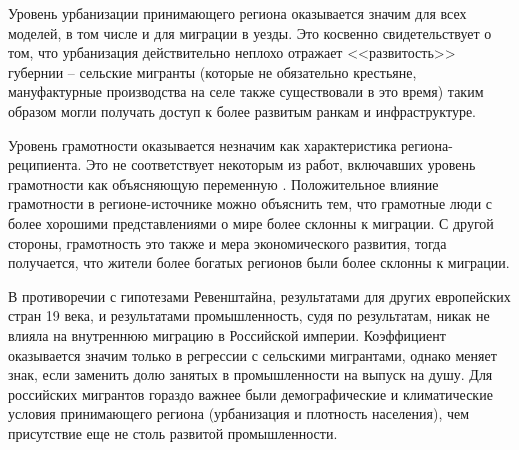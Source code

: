 \documentclass[a4paper,12pt]{article}
\begin{document}
Уровень урбанизации принимающего региона оказывается значим для всех моделей, в том числе и для миграции в уезды. Это косвенно свидетельствует о том, что урбанизация действительно неплохо отражает <<развитость>> губернии -- сельские мигранты (которые не обязательно крестьяне, мануфактурные производства на селе также существовали в это время) таким образом могли получать доступ к более развитым ранкам и инфраструктуре.

\afterpage{%
	
}\par

Уровень грамотности оказывается незначим как характеристика региона-реципиента. Это не соответствует некоторым из работ, включавших уровень грамотности как объясняющую переменную \citep{nicholas_internal_1987}. 
Положительное влияние грамотности в регионе-источнике можно объяснить тем, что грамотные люди с более хорошими представлениями о мире более склонны к миграции. С другой стороны, грамотность это также и мера экономического развития, тогда получается, что жители более богатых регионов были более склонны к миграции.

В противоречии с гипотезами Ревенштайна, результатами для других европейских стран 19 века, и результатами \citeauthor{leasure_internal_1968} промышленность, судя по результатам, никак не влияла на внутреннюю миграцию в Российской империи. Коэффициент оказывается значим только в регрессии с сельскими мигрантами, однако меняет знак, если заменить долю занятых в промышленности на выпуск на душу. Для российских мигрантов гораздо важнее были демографические и климатические условия принимающего региона (урбанизация и плотность населения), чем присутствие еще не столь развитой промышленности.

\end{document}
